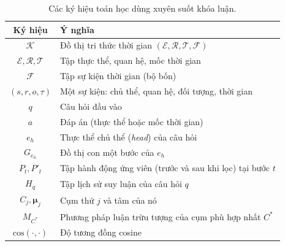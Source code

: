 \begin{table}[ht]
\centering
\caption{Các ký hiệu toán học dùng xuyên suốt khóa luận.}
\label{tab:notation}
\begin{tabular}{c L{9.5cm}}
\toprule
\textbf{Ký hiệu} & \textbf{Ý nghĩa} \\
\midrule
$\mathcal{K}$ & Đồ thị tri thức thời gian $(\mathcal{E}, \mathcal{R}, \mathcal{T}, \mathcal{F})$ \\
$\mathcal{E}, \mathcal{R}, \mathcal{T}$ & Tập thực thể, quan hệ, mốc thời gian \\
$\mathcal{F}$ & Tập sự kiện thời gian (bộ bốn) \\
$(s, r, o, \tau)$ & Một sự kiện: chủ thể, quan hệ, đối tượng, thời gian \\
$q$ & Câu hỏi đầu vào \\
$a$ & Đáp án (thực thể hoặc mốc thời gian) \\
$e_h$ & Thực thể chủ thể (\textit{head}) của câu hỏi \\
$G_{e_h}$ & Đồ thị con một bước của $e_h$ \\
$P_t, P'_t$ & Tập hành động ứng viên (trước và sau khi lọc) tại bước $t$ \\
$H_q$ & Tập lịch sử suy luận của câu hỏi $q$ \\
$C_j, \boldsymbol{\mu}_j$ & Cụm thứ $j$ và tâm của nó \\
$M_{C^*}$ & Phương pháp luận trừu tượng của cụm phù hợp nhất $C^*$ \\
$\mathrm{cos}(\cdot, \cdot)$ & Độ tương đồng cosine \\
\bottomrule
\end{tabular}
\end{table}
